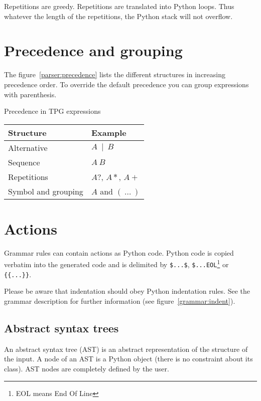 Repetitions are greedy.
Repetitions are translated into Python loops.
Thus whatever the length of the repetitions, the Python stack will not overflow. 

\section{Precedence and grouping}

The figure~\ref{parser:precedence} lists the different structures in increasing precedence order.
To override the default precedence you can group expressions with parenthesis.

\begin{tableau}
\caption{Precedence in TPG expressions}                         \label{parser:precedence}
\begin{tabular}{| l | l |}
\hline
    Structure           & Example \\
\hline
\hline
    Alternative         & $A~\mid~B$ \\
\hline
    Sequence            & $A~B$ \\
\hline
    Repetitions         & $A?$, $A*$, $A+$ \\
\hline
    Symbol and grouping & $A$ and $(~\ldots~)$ \\
\hline
\end{tabular}
\end{tableau}

\section{Actions}

Grammar rules can contain actions as Python code.
Python code is copied verbatim into the generated code and
is delimited by \verb!$...$!, \verb!$...EOL!\footnote{EOL means End Of Line} or \verb!{{...}}!.

Please be aware that indentation should obey Python indentation rules.
See the grammar description for further information (see figure~\ref{grammar:indent}).

\subsection{Abstract syntax trees}                              \label{parser:AST}

An abstract syntax tree (AST) is an abstract representation of the structure of the input.
A node of an AST is a Python object (there is no constraint about its class).
AST nodes are completely defined by the user.

